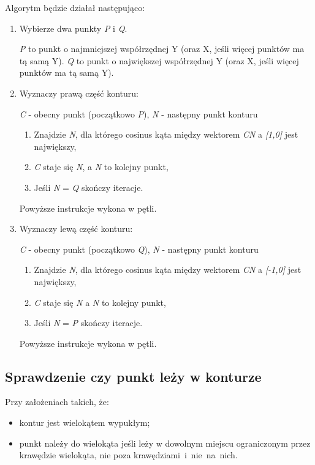 \documentclass[a4paper,11pt]{article}
\begin{document}
\noindent
Algorytm będzie działał następująco:
\begin{enumerate}
\item Wybierze dwa punkty \textit{P} i \textit{Q}.

\textit{P} to punkt o najmniejszej współrzędnej Y (oraz X, jeśli więcej punktów ma tą samą Y). \textit{Q} to punkt o największej współrzędnej Y (oraz X, jeśli więcej punktów ma tą samą Y).

\item Wyznaczy prawą część konturu:

\textit{C} - obecny punkt (początkowo \textit{P}), \textit{N} - następny punkt konturu 
\begin{enumerate}
\item Znajdzie \textit{N}, dla którego cosinus kąta między wektorem \textit{CN} a\textit{ [1,0]} jest największy,
\item \textit{C} staje się \textit{N}, a \textit{N} to kolejny punkt,
\item Jeśli \textit{N} = \textit{Q} skończy iteracje.
\end{enumerate}
Powyższe instrukcje wykona w pętli.

\item Wyznaczy lewą część konturu:

\textit{C} - obecny punkt (początkowo \textit{Q}), \textit{N} - następny punkt konturu 
\begin{enumerate}
\item Znajdzie \textit{N}, dla którego cosinus kąta między wektorem \textit{CN} a\textit{ [-1,0]} jest największy,
\item \textit{C} staje się \textit{N} a \textit{N} to kolejny punkt,
\item Jeśli \textit{N} = \textit{P} skończy iteracje.
\end{enumerate}
Powyższe instrukcje wykona w pętli.
\end{enumerate}

\subsection{Sprawdzenie czy punkt leży w konturze}
Przy założeniach takich, że:
\begin{itemize}
\item kontur jest wielokątem wypukłym;
\item punkt należy do wielokąta jeśli leży w dowolnym miejscu ograniczonym przez krawędzie wielokąta, nie poza krawędziami~i~nie~na~nich.
\end{itemize}
\end{document}
